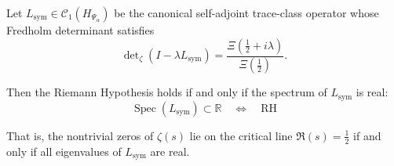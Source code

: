 \begin{corollary}
\label{cor:spectrum-real-equiv-rh}
Let \( L_{\mathrm{sym}} \in \mathcal{C}_1(H_{\Psi_\alpha}) \) be the canonical self-adjoint trace-class operator whose Fredholm determinant satisfies
\[
\det\nolimits_\zeta(I - \lambda L_{\mathrm{sym}})
= \frac{\Xi\left(\tfrac{1}{2} + i\lambda\right)}{\Xi\left(\tfrac{1}{2}\right)}.
\]

Then the Riemann Hypothesis holds if and only if the spectrum of \( L_{\mathrm{sym}} \) is real:
\[
\boxed{
\operatorname{Spec}(L_{\mathrm{sym}}) \subset \mathbb{R}
\quad \Longleftrightarrow \quad \mathrm{RH}
}
\]

\noindent
That is, the nontrivial zeros of \( \zeta(s) \) lie on the critical line \( \Re(s) = \tfrac{1}{2} \) if and only if all eigenvalues of \( L_{\mathrm{sym}} \) are real.

\end{corollary}
% 